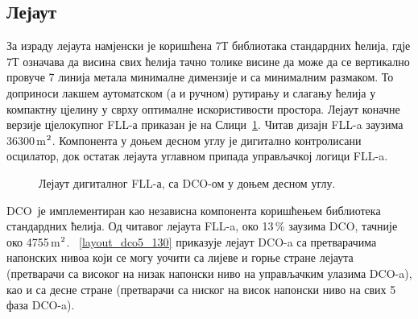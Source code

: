 \documentclass[master]{finthesis}
\def \FLL  {FLL} %
\def \DCO  {DCO} %
\begin{document}
\subsection{Лејаут}
За израду лејаута намјенски је коришћена 7Т библиотака стандардних ћелија, гдје 7Т означава да висина свих ћелија тачно толике висине да може да се вертикално провуче 7 линија метала минималне димензије и са минималним размаком. То доприноси лакшем аутоматском (а и ручном) рутирању и слагању ћелија у компактну цјелину у сврху оптималне искористивости простора. Лејаут коначне верзије цјелокупног \FLL-а приказан је на Слици~\ref{layout_FLL}. Читав дизајн \FLL-a заузима 36300\,\text\textmu m$^\text2$. Компонента у доњем десном углу је дигитално контролисани осцилатор, док остатак лејаута углавном припада управљачкој логици \FLL-a. \par
\begin{figure}[!ht]
	 \centering
	\caption{Лејаут дигиталног \FLL-а, са \DCO-ом у доњем десном углу.}
	\label{layout_FLL}
\end{figure}
\DCO\ је имплементиран као независна компонента коришћењем библиотека стандардних ћелија. Од читавог лејаута \FLL-a, око 13\,\% заузима \DCO, тачније око 4755\,\text\textmu m$^\text2$. \figurename~\ref{layout_dco5_130} приказује лејаут \DCO-a са претварачима напонских нивоа који се могу уочити са лијеве и горње стране лејаута (претварачи са високог на низак напонски ниво на управљачким улазима \DCO-a), као и са десне стране (претварачи са ниског на висок напонски ниво на свих 5 фаза \DCO-a). \par 
\end{document}
